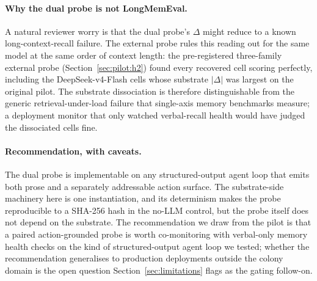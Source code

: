 \paragraph{Why the dual probe is not LongMemEval.}
A natural reviewer worry is that the dual probe's $\Delta$ might
reduce to a known long-context-recall failure. The external probe
rules this reading out for the same model at the same order of
context length: the pre-registered three-family external probe
(Section~\ref{sec:pilot:h2}) found every recovered cell scoring
perfectly, including the DeepSeek-v4-Flash cells whose substrate
$|\Delta|$ was largest on the original pilot. The substrate
dissociation is therefore distinguishable from the generic
retrieval-under-load failure that single-axis memory benchmarks
measure; a deployment monitor that only watched verbal-recall
health would have judged the dissociated cells fine.

\paragraph{Recommendation, with caveats.}
The dual probe is implementable on any structured-output agent
loop that emits both prose and a separately addressable action
surface. The substrate-side machinery here is one instantiation,
and its determinism makes the probe reproducible to a SHA-256
hash in the no-LLM control, but the probe itself does not depend
on the substrate. The recommendation we draw from the pilot is
that a paired action-grounded probe is worth co-monitoring with
verbal-only memory health checks on the kind of structured-output
agent loop we tested; whether the recommendation generalises to
production deployments outside the colony domain is the open
question Section~\ref{sec:limitations} flags as the gating
follow-on.
